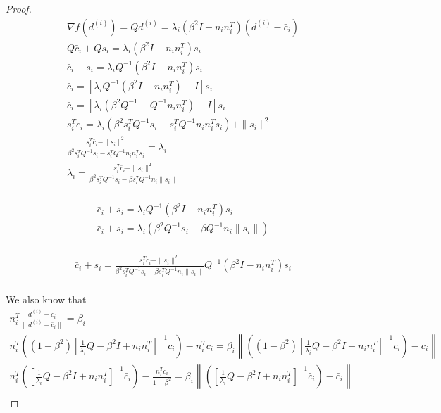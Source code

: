 \begin{proof}
\begin{align*}
\nabla f(d^{(i)}) = Q d^{(i)} = \lambda_i \left(\beta^2I - n_in_i^T\right)(d^{(i)} - \bar c_i) \\
Q \bar c_i + Q s_i = \lambda_i \left(\beta^2I - n_in_i^T\right)s_i \\
\bar c_i + s_i = \lambda_i Q^{-1} \left(\beta^2I - n_in_i^T\right)s_i \\
\bar c_i =\left[ \lambda_i Q^{-1} \left(\beta^2I - n_in_i^T\right) - I \right]s_i \\
\bar c_i =\left[ \lambda_i \left(\beta^2Q^{-1} - Q^{-1}n_in_i^T\right) - I \right]s_i \\
s_i^T{\bar c_i} =\lambda_i \left(\beta^2s_i^TQ^{-1}s_i - s_i^TQ^{-1}n_in_i^Ts_i\right) + \|s_i\|^2 \\
\frac{s_i^T{\bar c_i} - \|s_i\|^2}{\beta^2s_i^TQ^{-1}s_i - s_i^TQ^{-1}n_in_i^Ts_i} =\lambda_i \\
\lambda_i = \frac{s_i^T{\bar c_i} - \|s_i\|^2}{\beta^2s_i^TQ^{-1}s_i - \beta s_i^TQ^{-1}n_i\|s_i\|} \\
\end{align*}


\begin{align*}
\bar c_i + s_i = \lambda_i Q^{-1} \left(\beta^2I - n_in_i^T\right)s_i \\
\bar c_i + s_i = \lambda_i \left(\beta^2Q^{-1}s_i - \beta Q^{-1}n_i\|s_i\|\right) \\
\end{align*}


\begin{align*}
\bar c_i + s_i =  \frac{s_i^T{\bar c_i} - \|s_i\|^2}{\beta^2s_i^TQ^{-1}s_i - \beta s_i^TQ^{-1}n_i\|s_i\|}  Q^{-1} \left(\beta^2I - n_in_i^T\right)s_i \\
\end{align*}


We also know that
\begin{align*}
n_i^T\frac{d^{(i)} - \bar c_i}{\|d^{(i)} - \bar c_i\|} = \beta_i \\
n_i^T\left((1 - \beta^2) \left[\frac 1 {\lambda_i} Q - \beta^2 I + n_i n_i^T \right]^{-1} \bar c_i\right) - n_i^T\bar c_i = \beta_i\left\|\left((1 - \beta^2) \left[\frac 1 {\lambda_i} Q - \beta^2 I + n_i n_i^T \right]^{-1} \bar c_i\right) - \bar c_i\right\| \\
n_i^T\left(\left[\frac 1 {\lambda_i} Q - \beta^2 I + n_i n_i^T \right]^{-1} \bar c_i\right) - \frac{n_i^T\bar c_i}{1-\beta^2} = \beta_i\left\|\left(\left[\frac 1 {\lambda_i} Q - \beta^2 I + n_i n_i^T \right]^{-1} \bar c_i\right) - \bar c_i\right\| \\
\end{align*}










\end{proof}
